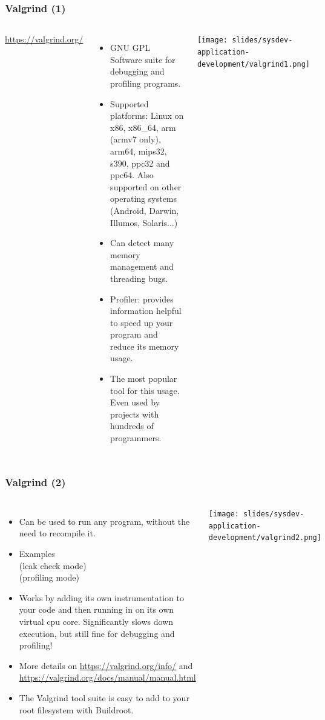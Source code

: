 \begin{frame}
  \frametitle{Valgrind (1)}
  \begin{columns}[T]
    \url{https://valgrind.org/}
    \begin{itemize}
    \item GNU GPL Software suite for debugging and profiling programs.
    \item Supported platforms: Linux on x86, x86\_64, arm (armv7 only),
      arm64, mips32, s390, ppc32 and ppc64. Also supported on other
      operating systems (Android, Darwin, Illumos, Solaris...)
    \item Can detect many memory management and threading bugs.
    \item Profiler: provides information helpful to speed up your
      program and reduce its memory usage.
    \item The most popular tool for this usage. Even used by projects
      with hundreds of programmers.
    \end{itemize}
    \texttt{[image: slides/sysdev-application-development/valgrind1.png]}
  \end{columns}
\end{frame}

\begin{frame}
  \frametitle{Valgrind (2)}
  \begin{columns}[T]
    \begin{itemize}
    \item Can be used to run any program, without the need to
      recompile it.
    \item Examples\\
      \small
       (leak check mode)\\
       (profiling mode)
      \normalsize
    \item Works by adding its own instrumentation to your code and
      then running in on its own virtual cpu core. Significantly slows
      down execution, but still fine for debugging and profiling!
    \item More details on \url{https://valgrind.org/info/} and
      \url{https://valgrind.org/docs/manual/manual.html}
    \item The Valgrind tool suite is easy to add to your root filesystem
          with Buildroot.
    \end{itemize}
    \texttt{[image: slides/sysdev-application-development/valgrind2.png]}
  \end{columns}
\end{frame}

